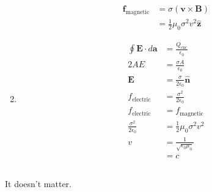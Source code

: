 \documentclass{article}
\renewcommand{\vec}[1]{\boldsymbol{\mathbf{#1}}}
\newcommand{\uvec}[1]{\hat{\vec{#1}}}
\begin{document}
\begin{enumerate}
        \begin{align*}
          \vec{f}_\text{magnetic} & = \sigma (\vec{v} \times \vec{B})         \\
                                  & = \frac{1}{2} \mu_0 \sigma^2 v^2 \uvec{z}
        \end{align*}

  \item

        \begin{align*}
          \oint \vec{E} \cdot d \vec{a} & = \frac{Q_\text{enc}}{\epsilon_0}      \\
          2 A E                         & = \frac{\sigma A}{\epsilon_0}          \\
          \vec{E}                       & = \frac{\sigma}{2 \epsilon_0} \uvec{n} \\
          f_\text{electric}             & = \frac{\sigma^2}{2 \epsilon_0}        \\
          f_\text{electric}             & = f_\text{magnetic}                    \\
          \frac{\sigma^2}{2 \epsilon_0} & = \frac{1}{2} \mu_0 \sigma^2 v^2       \\
          v                             & = \frac{1}{\sqrt{\epsilon_0 \mu_0}}    \\
                                        & = c
        \end{align*}
\end{enumerate}

\setcounter{subsection}{18}
\subsection{}

It doesn't matter.

\subsection{}
\end{document}
